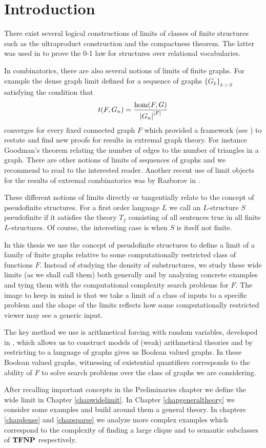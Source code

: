\chapter*{Introduction}

There exist several logical constructions of limits of classes of finite structures such as the ultraproduct construction and the compactness theorem. The latter was used in \cite{Fagin1976} to prove the 0-1 law for structures over relational vocabularies.

In combinatorics, there are also several notions of limits of finite graphs. For example the dense graph limit defined for a sequence of graphs $\{G_k\}_{k>0}$ satisfying the condition that
\[t(F,G_n)=\frac{\hom(F,G)}{\left|{G_n}\right|^{\left|{F}\right|}}\]
converges for every fixed connected graph $F$ which provided a framework (see \cite{lovasz2006limits}) to restate and find new proofs for results in extremal graph theory. For instance Goodman's theorem relating the number of edges to the number of triangles in a graph. There are other notions of limits of sequences of graphs and we recommend to read \cite{Nesetril2013} to the interested reader. Another recent use of limit objects for the results of extremal combinatorics was by Razborov in \cite{razborov2007flag}.

These different notions of limits directly or tangentially relate to the concept of pseudofinite structures. For a first order language $L$ we call an $L$-structure $S$ pseudofinite if it satisfies the theory $T_f$ consisting of all sentences true in all finite $L$-structures. Of course, the interesting case is when $S$ is itself not finite.

In this thesis we use the concept of pseudofinite structures to define a limit of a family of finite graphs relative to some computationally restricted class of functions $F$. Instead of studying the density of substructures, we study these wide limits (as we shall call them) both generally and by analyzing concrete examples and tying them with the computational complexity search problems for $F$. The image to keep in mind is that we take a limit of a class of inputs to a specific problem and the shape of the limits reflects how some computationally restricted viewer may see a generic input.

The key method we use is arithmetical forcing with random variables, developed in \cite{krajicek2010forcing}, which allows us to construct models of (weak) arithmetical theories and by restricting to a language of graphs gives us Boolean valued graphs. In these Boolean valued graphs, witnessing of existential quantifiers corresponds to the ability of $F$ to solve search problems over the class of graphs we are considering.

After recalling important concepts in the Preliminaries chapter we define the wide limit in Chapter \ref{chapwidelimit}. In Chapter \ref{chapgeneraltheory} we consider some examples and build around them a general theory. In chapters \ref{chapdense} and \ref{chapsparse} we analyze more complex examples which correspond to the complexity of finding a large clique and to semantic subclasses of $\textbf{TFNP}$ respectively. 
